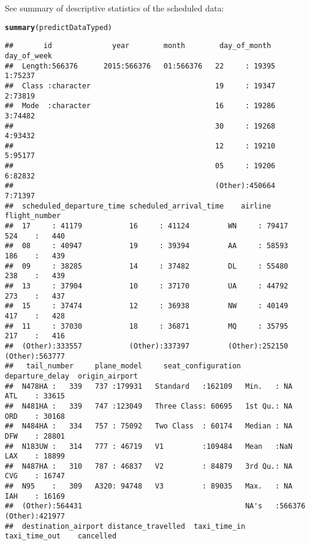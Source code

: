 \documentclass{article}\usepackage[]{graphicx}\usepackage[]{color}
\makeatletter
\newcommand{\hlstd}[1]{\textcolor[rgb]{0.345,0.345,0.345}{#1}}%
\newcommand{\hlkwd}[1]{\textcolor[rgb]{0.737,0.353,0.396}{\textbf{#1}}}%
\newenvironment{kframe}{%
 \def\at@end@of@kframe{}%
 \ifinner\ifhmode%
  \def\at@end@of@kframe{\end{minipage}}%
  \begin{minipage}{\columnwidth}%
 \fi\fi%
 \def\FrameCommand##1{\hskip\@totalleftmargin \hskip-\fboxsep
 \colorbox{shadecolor}{##1}\hskip-\fboxsep
     \hskip-\linewidth \hskip-\@totalleftmargin \hskip\columnwidth}%
 \MakeFramed {\advance\hsize-\width
   \@totalleftmargin\z@ \linewidth\hsize
   \@setminipage}}%
 {\par\unskip\endMakeFramed%
 \at@end@of@kframe}
\newenvironment{knitrout}{}{} %
\makeatother
\begin{document}
\pagebreak

See summary of descriptive statistics of the scheduled data: 
\begin{knitrout}
\color{fgcolor}\begin{kframe}
\begin{alltt}
\hlkwd{summary}\hlstd{(predictDataTyped)}
\end{alltt}
\begin{verbatim}
##       id              year        month        day_of_month    day_of_week
##  Length:566376      2015:566376   01:566376   22     : 19395   1:75237    
##  Class :character                             19     : 19347   2:73819    
##  Mode  :character                             16     : 19286   3:74482    
##                                               30     : 19268   4:93432    
##                                               12     : 19210   5:95177    
##                                               05     : 19206   6:82832    
##                                               (Other):450664   7:71397    
##  scheduled_departure_time scheduled_arrival_time    airline       flight_number   
##  17     : 41179           16     : 41124         WN     : 79417   524    :   440  
##  08     : 40947           19     : 39394         AA     : 58593   186    :   439  
##  09     : 38285           14     : 37482         DL     : 55480   238    :   439  
##  13     : 37904           10     : 37170         UA     : 44792   273    :   437  
##  15     : 37474           12     : 36938         NW     : 40149   417    :   428  
##  11     : 37030           18     : 36871         MQ     : 35795   217    :   416  
##  (Other):333557           (Other):337397         (Other):252150   (Other):563777  
##   tail_number     plane_model     seat_configuration departure_delay  origin_airport  
##  N478HA :   339   737 :179931   Standard   :162109   Min.   : NA      ATL    : 33615  
##  N481HA :   339   747 :123049   Three Class: 60695   1st Qu.: NA      ORD    : 30168  
##  N484HA :   334   757 : 75092   Two Class  : 60174   Median : NA      DFW    : 28801  
##  N183UW :   314   777 : 46719   V1         :109484   Mean   :NaN      LAX    : 18899  
##  N487HA :   310   787 : 46837   V2         : 84879   3rd Qu.: NA      CVG    : 16747  
##  N95    :   309   A320: 94748   V3         : 89035   Max.   : NA      IAH    : 16169  
##  (Other):564431                                      NA's   :566376   (Other):421977  
##  destination_airport distance_travelled  taxi_time_in    taxi_time_out    cancelled     

\end{verbatim}
\end{kframe}
\end{knitrout}
\end{document}
